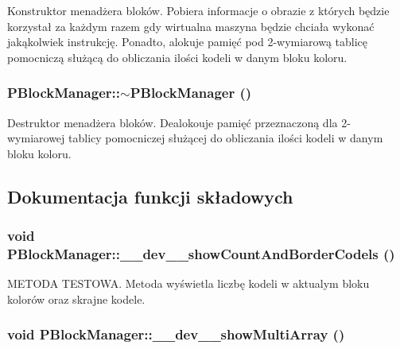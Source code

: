 Konstruktor menadżera bloków. Pobiera informacje o obrazie z których będzie korzystał za każdym razem gdy wirtualna maszyna będzie chciała wykonać jakąkolwiek instrukcję. Ponadto, alokuje pamięć pod 2-wymiarową tablicę pomocniczą służącą do obliczania ilości kodeli w danym bloku koloru. \hypertarget{classPBlockManager_52d7abb7f858625e9e014fb555f571a6}{
\subsubsection[{$\sim$PBlockManager}]{\setlength{\rightskip}{0pt plus 5cm}PBlockManager::$\sim$PBlockManager ()}}
\label{classPBlockManager_52d7abb7f858625e9e014fb555f571a6}


Destruktor menadżera bloków. Dealokouje pamięć przeznaczoną dla 2-wymiarowej tablicy pomocniczej służącej do obliczania ilości kodeli w danym bloku koloru. 

\subsection{Dokumentacja funkcji składowych}
\hypertarget{classPBlockManager_d0ed8ac41d59c34eb88aa30428961a82}{
\subsubsection[{\_\-\_\-dev\_\-\_\-showCountAndBorderCodels}]{\setlength{\rightskip}{0pt plus 5cm}void PBlockManager::\_\-\_\-dev\_\-\_\-showCountAndBorderCodels ()}}
\label{classPBlockManager_d0ed8ac41d59c34eb88aa30428961a82}


METODA TESTOWA. Metoda wyświetla liczbę kodeli w aktualym bloku kolorów oraz skrajne kodele. \hypertarget{classPBlockManager_e6298891058bd316c07071db0c851b2f}{
\subsubsection[{\_\-\_\-dev\_\-\_\-showMultiArray}]{\setlength{\rightskip}{0pt plus 5cm}void PBlockManager::\_\-\_\-dev\_\-\_\-showMultiArray ()}}
\label{classPBlockManager_e6298891058bd316c07071db0c851b2f}


